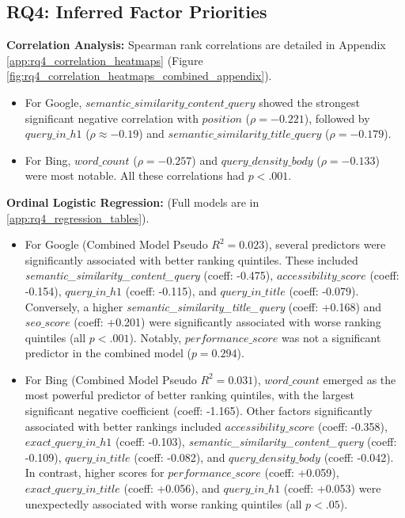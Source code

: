 \documentclass[a4paper,fleqn]{cas-sc}
\newcommand{\longvar}[1]{\textit{#1}}
\begin{document}
\subsection{RQ4: Inferred Factor Priorities}
\label{subsec:results_rq4}
\textbf{Correlation Analysis:} Spearman rank correlations are detailed in Appendix \ref{app:rq4_correlation_heatmaps} (Figure \ref{fig:rq4_correlation_heatmaps_combined_appendix}).
\begin{itemize}
\item For Google, $\longvar{semantic_similarity_content_query}$ showed the strongest significant negative correlation with $position$ ($\rho = -0.221$), followed by $query\_in\_h1$ ($\rho \approx -0.19$) and $\longvar{semantic_similarity\_title\_query}$ ($\rho = -0.179$).
\item For Bing, $word\_count$ ($\rho = -0.257$) and $query\_density\_body$ ($\rho = -0.133$) were most notable. All these correlations had $p < .001$.
\end{itemize}

\textbf{Ordinal Logistic Regression:} (Full models are in \ref{app:rq4_regression_tables}).
\begin{itemize}
\item For Google (Combined Model Pseudo $R^2 = 0.023$), several predictors were significantly associated with better ranking quintiles. These included \longvar{semantic_similarity_content_query} (coeff: -0.475), $accessibility\_score$ (coeff: -0.154), $query\_in\_h1$ (coeff: -0.115), and $query\_in\_title$ (coeff: -0.079). Conversely, a higher \longvar{semantic_similarity_title\_query} (coeff: +0.168) and $seo\_score$ (coeff: +0.201) were significantly associated with worse ranking quintiles (all $p < .001$). Notably, $performance\_score$ was not a significant predictor in the combined model ($p = 0.294$).
\item For Bing (Combined Model Pseudo $R^2 = 0.031$), $word\_count$ emerged as the most powerful predictor of better ranking quintiles, with the largest significant negative coefficient (coeff: -1.165). Other factors significantly associated with better rankings included $accessibility\_score$ (coeff: -0.358), $exact\_query\_in\_h1$ (coeff: -0.103), \longvar{semantic_similarity_content_query} (coeff: -0.109), $query\_in\_title$ (coeff: -0.082), and $query\_density\_body$ (coeff: -0.042). In contrast, higher scores for $performance\_score$ (coeff: +0.059), $exact\_query\_in\_title$ (coeff: +0.056), and $query\_in\_h1$ (coeff: +0.053) were unexpectedly associated with worse ranking quintiles (all $p < .05$).
\end{itemize}
\end{document}
